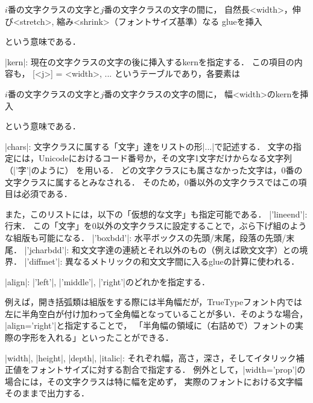 {\par\medskip\advance{}\zw\noindent{}\zw
$i$番の文字クラスの文字と$j$番の文字クラスの文字の間に，
自然長<width>，伸び<stretch>, 縮み<shrink>（フォントサイズ基準）なる
glueを挿入
\par\medskip}

\noindent という意味である．

\itemitem |kern|: 現在の文字クラスの文字の後に挿入するkernを指定する．
この項目の内容も，
\begintt
{ [<j>] = <width>, ... }
\endtt
というテーブルであり，各要素は

{\par\medskip\advance{}\zw\noindent{}\zw
$i$番の文字クラスの文字と$j$番の文字クラスの文字の間に，\hfil\break
幅<width>のkernを挿入
\par\medskip}

\noindent という意味である．

\itemitem |chars|: 文字クラスに属する「文字」達をリストの形|{...}|で記述する．
文字の指定には，Unicodeにおけるコード番号か，その文字1文字だけからなる文字列（|'字'|のように）
を用いる．
どの文字クラスにも属さなかった文字は，0番の文字クラスに属するとみなされる．
そのため，0番以外の文字クラスではこの項目は必須である．

また，このリストには，以下の「仮想的な文字」も指定可能である．
\itemT |'lineend'|: 行末．
この「文字」を0以外の文字クラスに設定することで，ぶら下げ組のような組版も可能になる．
\itemT |'boxbdd'|: 水平ボックスの先頭/末尾，段落の先頭/末尾．
\itemT |'jcharbdd'|: 和文文字達の連続とそれ以外のもの（例えば欧文文字）との境界．
\itemT |'diffmet'|: 異なるメトリックの和文文字間に入るglueの計算に使われる．
\enditem


\itemitem |align|: |'left'|, |'middle'|, |'right'|のどれかを指定する．

例えば，開き括弧類は組版をする際には半角幅だが，TrueTypeフォント内では
左に半角空白が付け加わって全角幅となっていることが多い．そのような場合，
|align='right'|と指定することで，
「半角幅の領域に（右詰めで）フォントの実際の字形を入れる」といったことができる．

\itemitem |width|, |height|, |depth|, |italic|: 
それぞれ幅，高さ，深さ，そしてイタリック補正値をフォントサイズに対する割合で指定する．
例外として，|width='prop'|の場合には，その文字クラスは特に幅を定めず，
実際のフォントにおける文字幅そのままで出力する．


